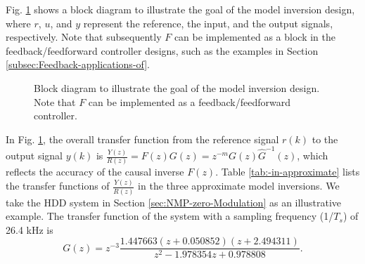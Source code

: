 \documentclass [11pt, proquest] {uwthesis}[2020/02/24]
\begin{document}
Fig. \ref{fig:Block-diagram-for-1} shows a block diagram to illustrate
the goal of the model inversion design, where $r$, $u$, and $y$
represent the reference, the input, and the output signals, respectively.
Note that subsequently $F$ can be implemented as a block in the feedback/feedforward
controller designs, such as the examples in Section \ref{subsec:Feedback-applications-of}.
\begin{figure}[!ht]
\begin{centering}
\par\end{centering}
\caption{\label{fig:Block-diagram-for-1}Block diagram to illustrate the goal
of the model inversion design. Note that $F$ can be implemented as
a feedback/feedforward controller. }
\end{figure}
 In Fig. \ref{fig:Block-diagram-for-1}, the overall transfer function
from the reference signal $r(k)$ to the output signal $y(k)$ is
$\frac{Y(z)}{R(z)}=F(z)G(z)=z^{-m}G(z)\hat{G}^{-1}(z)$, which reflects
the accuracy of the causal inverse $F(z)$. Table \ref{tab:-in-approximate}
lists the transfer functions of $\frac{Y(z)}{R(z)}$ in the three
approximate model inversions. We take the HDD system
in Section \ref{sec:NMP-zero-Modulation} as an illustrative example.
The transfer function of the system with a sampling frequency (1/$T_{s}$)
of 26.4 kHz is
\begin{equation}
G(z)=z^{-3}\frac{1.447663(z+0.050852)(z+2.494311)}{z^{2}-1.978354z+0.978808}.\label{eq:Pd}
\end{equation}
\end{document}
